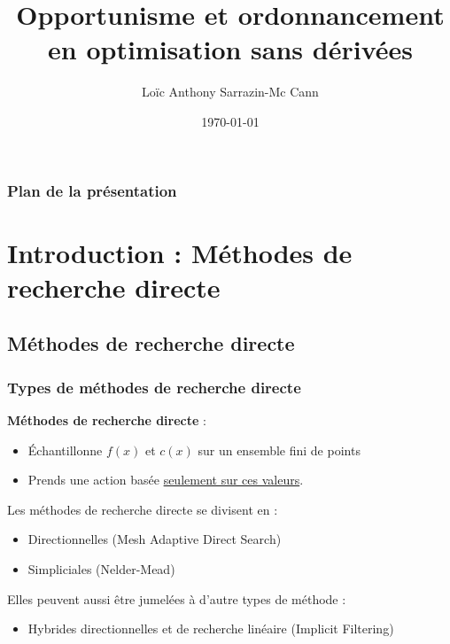 \documentclass{beamer}
\title[Opportunisme et ordonnancement]{Opportunisme et ordonnancement en optimisation sans dérivées} %
\author{Loïc Anthony Sarrazin-Mc Cann} %
\institute[GERAD] %
{
	École Polytechnique de Montréal \\ %
	\medskip
}
\date{\today} %
\begin{document}
	
\begin{frame}
	\titlepage %
\end{frame}

\begin{frame}
\frametitle{Plan de la présentation} %
\tableofcontents[hideallsubsections] %
\end{frame}


\section[Introduction]{Introduction : Méthodes de recherche directe} 
\tableofcontents[currentsection,currentsubsection,subsectionstyle=show/hide]
\subsection{Méthodes de recherche directe}
\begin{frame}
\frametitle{Types de méthodes de recherche directe}
\textbf{Méthodes de recherche directe} :
\begin{itemize}
	\pause
	\item Échantillonne $f(x)$ et $c(x)$ sur un ensemble fini de points
	\pause
	\item Prends une action basée \underline{seulement sur ces valeurs}.
\end{itemize}
\bigskip
\pause
Les méthodes de recherche directe se divisent en :
\begin{itemize}
	\pause
	\item Directionnelles (Mesh Adaptive Direct Search)
	\pause
	\item Simpliciales (Nelder-Mead)
\end{itemize}
\pause
\medskip
Elles peuvent aussi être jumelées à d'autre types de méthode :
\begin{itemize}
	\pause
	\item Hybrides directionnelles et de recherche linéaire (Implicit Filtering)
\end{itemize}
\end{frame}
\end{document}
